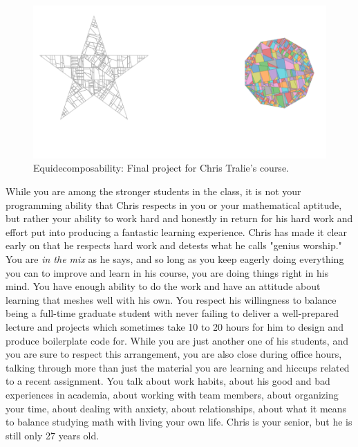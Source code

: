 \documentclass[a4paper, 11pt]{article} %
\begin{document}
\begin{figure}[h!]
	\centering
	\includegraphics[width=\textwidth]{star-to-nonagon-teaser}
	\caption*{Equidecomposability: Final project for Chris Tralie's course.}
\end{figure}

While you are among the stronger students in the class, it is not your programming ability that Chris respects in you or your mathematical aptitude, but rather your ability to work hard and honestly in return for his hard work and effort put into producing a fantastic learning experience. Chris has made it clear early on that he respects hard work and detests what he calls "genius worship." You are \textit{in the mix} as he says, and so long as you keep eagerly doing everything you can to improve and learn in his course, you are doing things right in his mind. You have enough ability to do the work and have an attitude about learning that meshes well with his own. You respect his willingness to balance being a full-time graduate student with never failing to deliver a well-prepared lecture and projects which sometimes take 10 to 20 hours for him to design and produce boilerplate code for. While you are just another one of his students, and you are sure to respect this arrangement, you are also close during office hours, talking through more than just the material you are learning and hiccups related to a recent assignment. You talk about work habits, about his good and bad experiences in academia, about working with team members, about organizing your time, about dealing with anxiety, about relationships, about what it means to balance studying math with living your own life. Chris is your senior, but he is still only 27 years old.
\end{document}
